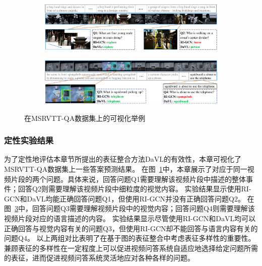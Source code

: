 \begin{figure}[!t]
\vspace{-3mm}
\begin{subfigure}[b]{1.0\textwidth}
\centering
\includegraphics[width=0.98\linewidth]{figure/c2_vis_a.pdf}
\label{fig:c2_vis_correct_1}
\end{subfigure}
\begin{subfigure}[b]{1.0\textwidth}
\centering
\vspace{-1mm}
\includegraphics[width=0.98\linewidth]{figure/c2_vis_b.pdf}
\label{fig:c2_vis_correct_2}
\end{subfigure}
\vspace{-6mm}
\caption{在MSRVTT-QA数据集上的可视化举例
}
\end{figure}

\subsubsection{定性实验结果}
为了定性地评估本章节所提出的表征整合方法DaVL的有效性，本章可视化了MSRVTT-QA数据集上一些答案预测结果。
在图~\ref{fig:c2_vis_correct_1}中，本章展示了对应于同一视频片段的两个问题。具体来说，回答问题Q1需要理解该视频片段中描述的整体事件；回答Q2则需要理解该视频片段中细粒度的视觉内容。
实验结果显示使用RI-GCN和DaVL均能正确回答问题Q1，但使用RI-GCN并没有正确回答问题Q2。
在图~\ref{fig:c2_vis_correct_2}中，回答问题Q3需要理解视频片段中的视觉内容；回答问题Q4则需要理解该视频片段对应的语言描述的内容。
实验结果显示尽管使用RI-GCN和DaVL均可以正确回答与视觉内容有关的问题Q3，但使用RI-GCN却不能回答与语言内容有关的问题Q4。
以上两组对比表明了在基于图的表征整合中考虑表征多样性的重要性。
兼顾表征的多样性在一定程度上可以促进视频问答系统自适应地选择给定问题所需的表征，进而促进视频问答系统灵活地应对各种各样的问题。



